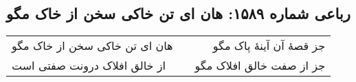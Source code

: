 \begin{center}
\section*{رباعی شماره ۱۵۸۹: هان ای تن خاکی سخن از خاک مگو}
\label{sec:1589}
\begin{longtable}{l p{0.5cm} r}
هان ای تن خاکی سخن از خاک مگو
&&
جز قصهٔ آن آینهٔ پاک مگو
\\
از خالق افلاک درونت صفتی است
&&
جز از صفت خالق افلاک مگو
\\
\end{longtable}
\end{center}
